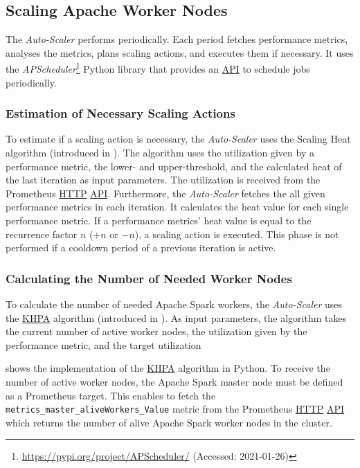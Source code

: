 \subsection{Scaling Apache Worker Nodes}
The \textit{Auto-Scaler} performs periodically. Each period fetches performance metrics, analyses the metrics, plans scaling actions, and executes them if necessary.
It uses the \textit{APScheduler}\footnote{\url{https://pypi.org/project/APScheduler/} (Accessed: 2021-01-26)} Python library that provides an \hyperlink{abbr:api}{API} to schedule jobs periodically.


\subsubsection{Estimation of Necessary Scaling Actions}
To estimate if a scaling action is necessary, the \textit{Auto-Scaler} uses the Scaling Heat algorithm (introduced in ).
The algorithm uses the utilization given by a performance metric, the lower- and upper-threshold, and the calculated heat of the last iteration as input parameters.
The utilization is received from the Prometheus \hyperlink{abbr:http}{HTTP} \hyperlink{abbr:api}{API}. Furthermore, the \textit{Auto-Scaler} fetches the all given performance metrics in each iteration. It calculates the heat value for each single performance metric.
If a performance metrics' heat value is equal to the recurrence factor $n$ ($+n$ or $-n$), a scaling action is executed.
This phase is not performed if a cooldown period of a previous iteration is active.


\subsubsection{Calculating the Number of Needed Worker Nodes}
To calculate the number of needed Apache Spark workers, the \textit{Auto-Scaler} uses the \hyperlink{abbr:khpa}{KHPA} algorithm (introduced in ).
As input parameters, the algorithm takes the current number of active worker nodes, the utilization given by the performance metric, and the target utilization


 shows the implementation of the \hyperlink{abbr:khpa}{KHPA} algorithm in Python.
To receive the number of active worker nodes, the Apache Spark master node must be defined as a Prometheus target. This enables to fetch the \texttt{metrics\_master\_aliveWorkers\_Value} metric from the Prometheus \hyperlink{abbr:http}{HTTP} \hyperlink{abbr:api}{API} which returns the number of alive Apache Spark worker nodes in the cluster.

